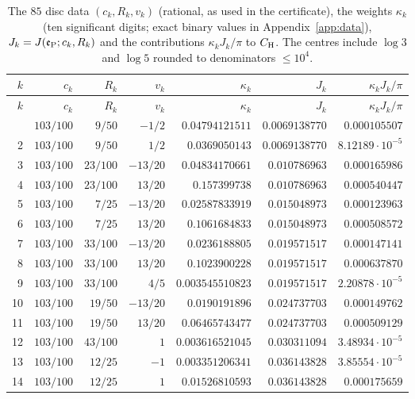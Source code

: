 \documentclass[11pt,reqno]{amsart}
\numberwithin{equation}{section}
\theoremstyle{definition}
\theoremstyle{remark}
\begin{document}
\small
\begin{center}
\begin{longtable}{@{}rrrrrrr@{}}\caption{The $85$ disc data $(c_k,R_k,v_k)$ (rational, as used in the certificate), the weights $\kappa_k$ (ten significant digits; exact binary values in Appendix~\ref{app:data}), $J_k=J(\mathfrak e_{\rm P};c_k,R_k)$ and the contributions $\kappa_kJ_k/\pi$ to $C_{\rm H}$. The centres include $\log3$ and $\log5$ rounded to denominators $\le10^4$.}\label{tab:hybrid_discs}\\
\toprule $k$ & $c_k$ & $R_k$ & $v_k$ & $\kappa_k$ & $J_k$ & $\kappa_kJ_k/\pi$\\\midrule\endfirsthead
\toprule $k$ & $c_k$ & $R_k$ & $v_k$ & $\kappa_k$ & $J_k$ & $\kappa_kJ_k/\pi$\\\midrule\endhead
\bottomrule\endfoot
1 & $103/100$ & $9/50$ & $-1/2$ & $0.04794121511$ & $0.0069138770$ & $0.000105507$\\
2 & $103/100$ & $9/50$ & $1/2$ & $0.0369050143$ & $0.0069138770$ & $8.12189\cdot10^{-5}$\\
3 & $103/100$ & $23/100$ & $-13/20$ & $0.04834170661$ & $0.010786963$ & $0.000165986$\\
4 & $103/100$ & $23/100$ & $13/20$ & $0.157399738$ & $0.010786963$ & $0.000540447$\\
5 & $103/100$ & $7/25$ & $-13/20$ & $0.02587833919$ & $0.015048973$ & $0.000123963$\\
6 & $103/100$ & $7/25$ & $13/20$ & $0.1061684833$ & $0.015048973$ & $0.000508572$\\
7 & $103/100$ & $33/100$ & $-13/20$ & $0.0236188805$ & $0.019571517$ & $0.000147141$\\
8 & $103/100$ & $33/100$ & $13/20$ & $0.1023900228$ & $0.019571517$ & $0.000637870$\\
9 & $103/100$ & $33/100$ & $4/5$ & $0.003545510823$ & $0.019571517$ & $2.20878\cdot10^{-5}$\\
10 & $103/100$ & $19/50$ & $-13/20$ & $0.0190191896$ & $0.024737703$ & $0.000149762$\\
11 & $103/100$ & $19/50$ & $13/20$ & $0.06465743477$ & $0.024737703$ & $0.000509129$\\
12 & $103/100$ & $43/100$ & $1$ & $0.003616521045$ & $0.030311094$ & $3.48934\cdot10^{-5}$\\
13 & $103/100$ & $12/25$ & $-1$ & $0.003351206341$ & $0.036143828$ & $3.85554\cdot10^{-5}$\\
14 & $103/100$ & $12/25$ & $1$ & $0.01526810593$ & $0.036143828$ & $0.000175659$\\

\end{longtable}
\end{center}
\end{document}
